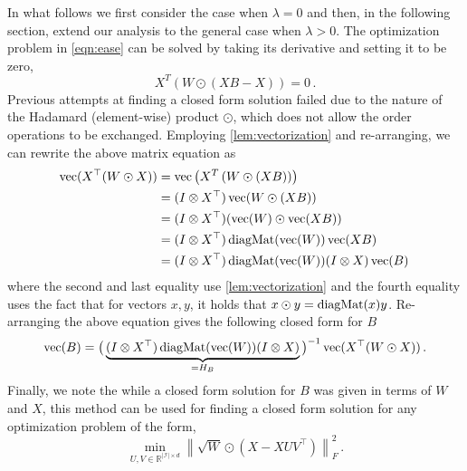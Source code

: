 In what follows we first consider the case when $\lambda = 0$ and then, in the following section, extend our analysis to the general case when $\lambda >0$. 
The optimization problem in \cref{eqn:ease} can be solved by taking its derivative and setting it to be zero, 
\begin{equation*}
     X^T\left(W \odot(XB - X) \right) = 0\,.
\end{equation*}
Previous attempts at finding a closed form solution failed due to the nature of the Hadamard (element-wise) product $\odot$, which does not allow the order operations to be exchanged. Employing \cref{lem:vectorization} and re-arranging, we can rewrite the above matrix equation as
\begin{align*}\label{eqn:ease-soln}
    \operatorname{vec}(X^\top(W\odot X)) &= \operatorname{vec}\left(X^T\left(W \odot(XB)\right)\right) \\
    &= (I\otimes X^\top)\operatorname{vec}(W\odot(XB)) \\
    &= (I\otimes X^\top)(\operatorname{vec}(W)\odot\operatorname{vec}(XB)) \\
    &= (I \otimes X^\top)\operatorname{diagMat}(\operatorname{vec}(W))\operatorname{vec}(XB) \\
    &= (I\otimes X^\top)\operatorname{diagMat}(\operatorname{vec}(W))(I\otimes X)\operatorname{vec}(B)\,
\end{align*}
where the second and last equality use \cref{lem:vectorization} and the fourth equality uses the fact that for vectors $x,y$, it holds that $x\odot y = \operatorname{diagMat}(x)y$. Re-arranging the above equation gives the following closed form for $B$
\begin{equation}\label{eqn:closed-form-ease}
    \operatorname{vec}(B) = \big(\underbrace{(I\otimes X^\top)\operatorname{diagMat}(\operatorname{vec}(W))(I\otimes X)}_{=H_B}\big)^{-1} \operatorname{vec}(X^\top(W\odot X))\,.
\end{equation}
Finally, we note the while a closed form solution for $B$ was given in terms of $W$ and $X$, this method can be used for finding a closed form solution for any optimization problem of the form,
\begin{equation*}
    \min_{U,V\in\mathbb{R}^{|\mathcal{I}|\times d}} \left\lVert \sqrt{W} \odot (X - XUV^\top)\right\rVert_F^2\,.
\end{equation*}

